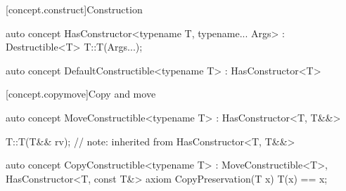 \documentclass[american,twoside]{book}
\begin{document}
[concept.construct]{Construction}
\begin{itemdecl}
auto concept HasConstructor<typename T, typename... Args> : Destructible<T> {
  T::T(Args...);
}
\end{itemdecl}

\begin{itemdescr}
\pnum
{}
\end{itemdescr}

\begin{itemdecl}
auto concept DefaultConstructible<typename T> : HasConstructor<T> { }
\end{itemdecl}

\begin{itemdescr}
\pnum
{}
\end{itemdescr}

[concept.copymove]{Copy and move}
\begin{itemdecl}
auto concept MoveConstructible<typename T> : HasConstructor<T, T&&> { }
\end{itemdecl}

\begin{itemdescr}
\pnum
{}
\end{itemdescr}

\begin{itemdecl}
T::T(T&& rv); // note: inherited from HasConstructor<T, T\&\&>
\end{itemdecl}

\begin{itemdescr}
\pnum
{}
\end{itemdescr}

\begin{itemdecl}
auto concept CopyConstructible<typename T> : MoveConstructible<T>, HasConstructor<T, const T&> {
  axiom CopyPreservation(T x) {
    T(x) == x;
  }
}
\end{itemdecl}
\end{document}
